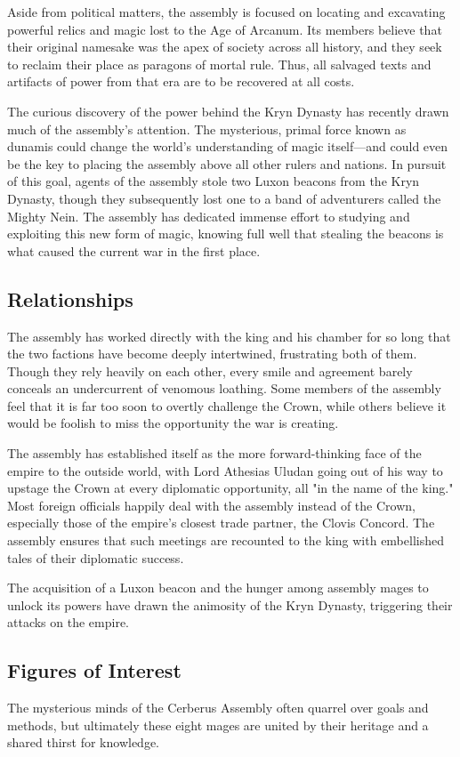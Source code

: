 \documentclass[10pt,a4paper,twoside,bg=print,twocolumn,openany,nodeprecatedcode]{dndbook}
\begin{document}
Aside from political matters, the assembly is focused on locating and excavating powerful relics and magic lost to the Age of Arcanum. Its members believe that their original namesake was the apex of society across all history, and they seek to reclaim their place as paragons of mortal rule. Thus, all salvaged texts and artifacts of power from that era are to be recovered at all costs.

The curious discovery of the power behind the Kryn Dynasty has recently drawn much of the assembly's attention. The mysterious, primal force known as dunamis could change the world's understanding of magic itself—and could even be the key to placing the assembly above all other rulers and nations. In pursuit of this goal, agents of the assembly stole two Luxon beacons from the Kryn Dynasty, though they subsequently lost one to a band of adventurers called the Mighty Nein. The assembly has dedicated immense effort to studying and exploiting this new form of magic, knowing full well that stealing the beacons is what caused the current war in the first place.

\subsection{Relationships}
The assembly has worked directly with the king and his chamber for so long that the two factions have become deeply intertwined, frustrating both of them. Though they rely heavily on each other, every smile and agreement barely conceals an undercurrent of venomous loathing. Some members of the assembly feel that it is far too soon to overtly challenge the Crown, while others believe it would be foolish to miss the opportunity the war is creating.

The assembly has established itself as the more forward-thinking face of the empire to the outside world, with Lord Athesias Uludan going out of his way to upstage the Crown at every diplomatic opportunity, all "in the name of the king." Most foreign officials happily deal with the assembly instead of the Crown, especially those of the empire's closest trade partner, the Clovis Concord. The assembly ensures that such meetings are recounted to the king with embellished tales of their diplomatic success.

The acquisition of a Luxon beacon and the hunger among assembly mages to unlock its powers have drawn the animosity of the Kryn Dynasty, triggering their attacks on the empire.

\subsection{Figures of Interest}
The mysterious minds of the Cerberus Assembly often quarrel over goals and methods, but ultimately these eight mages are united by their heritage and a shared thirst for knowledge.
\end{document}
